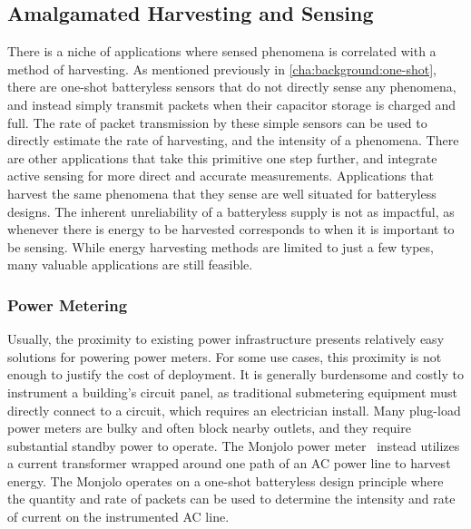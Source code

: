 \subsection{Amalgamated Harvesting and Sensing}
There is a niche of applications where sensed phenomena is correlated with a method of harvesting.
As mentioned previously in \cref{cha:background:one-shot}, there are one-shot batteryless sensors that do not directly sense any phenomena, and instead simply transmit packets when their capacitor storage is charged and full.
The rate of packet transmission by these simple sensors can be used to directly estimate the rate of harvesting, and the intensity of a phenomena. 
There are other applications that take this primitive one step further, and integrate active sensing for more direct and accurate measurements.
Applications that harvest the same phenomena that they sense are well situated for batteryless designs.
The inherent unreliability of a batteryless supply is not as impactful, as whenever there is energy to be harvested corresponds to when it is important to be sensing.
While energy harvesting methods are limited to just a few types, many valuable applications are still feasible.

\subsubsection{Power Metering}
Usually, the proximity to existing power infrastructure presents relatively easy solutions for powering power meters.
For some use cases, this proximity is not enough to justify the cost of deployment. 
It is generally burdensome and costly to instrument a building's circuit panel, as traditional submetering equipment must directly connect to a circuit, which requires an electrician install. 
Many plug-load power meters are bulky and often block nearby outlets, and they require substantial standby power to operate. 
The Monjolo power meter~\cite{debruin2013monjolo} instead utilizes a current transformer wrapped around one path of an AC power line to harvest energy.
The Monjolo operates on a one-shot batteryless design principle where the quantity and rate of packets can be used to determine the intensity and rate of current on the instrumented AC line.

